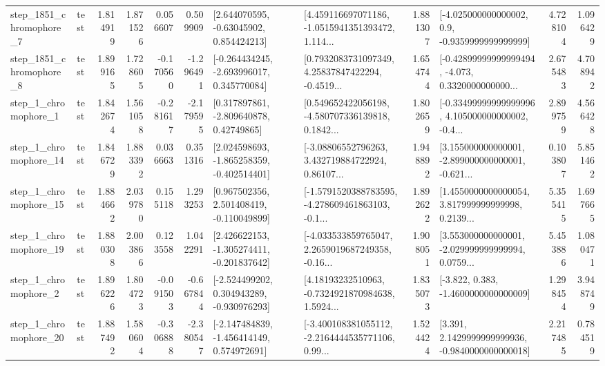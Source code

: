 \begin{tabular}{llrrrrllrlrr}
  step\_1851\_chromophore\_7 &      test &      1.814919 &    1.871526 &      0.056607 &  0.509909 &     [2.644070595, -0.63045902, 0.854424213] &  [4.459116697071186, -1.0515941351393472, 1.114... &       1.881307 &     [-4.025000000000002, 0.9, -0.9359999999999999] &            4.728104 &          1.096429 \\
  step\_1851\_chromophore\_8 &      test &      1.899165 &    1.728605 &     -0.170560 & -1.296491 &   [-0.264434245, -2.693996017, 0.345770084] &  [0.7932083731097349, 4.25837847422294, -0.4519... &       1.654744 &  [-0.42899999999999494, -4.073, 0.3320000000000... &            2.675483 &          4.708942 \\
     step\_1\_chromophore\_1 &      test &      1.842674 &    1.561058 &     -0.281617 & -2.179595 &     [0.317897861, -2.809640878, 0.42749865] &  [0.549652422056198, -4.580707336139818, 0.1842... &       1.802659 &  [-0.33499999999999996, 4.105000000000002, -0.4... &            2.899759 &          4.566428 \\
    step\_1\_chromophore\_14 &      test &      1.846729 &    1.883392 &      0.036663 &  0.351316 &   [2.024598693, -1.865258359, -0.402514401] &  [-3.08806552796263, 3.432719884722924, 0.86107... &       1.948892 &  [3.155000000000001, -2.899000000000001, -0.621... &            0.103807 &          5.851462 \\
    step\_1\_chromophore\_15 &      test &      1.884662 &    2.039780 &      0.155118 &  1.293253 &    [0.967502356, 2.501408419, -0.110049899] &  [-1.5791520388783595, -4.278609461863103, -0.1... &       1.892622 &  [1.4550000000000054, 3.817999999999998, 0.2139... &            5.355415 &          1.697665 \\
    step\_1\_chromophore\_19 &      test &      1.880308 &    2.003866 &      0.123558 &  1.042291 &   [2.426622153, -1.305274411, -0.201837642] &  [-4.033533859765047, 2.2659019687249358, -0.16... &       1.908051 &  [3.553000000000001, -2.029999999999994, 0.0759... &            5.453886 &          1.080471 \\
     step\_1\_chromophore\_2 &      test &      1.896226 &    1.804723 &     -0.091503 & -0.667844 &   [-2.524499202, 0.304943289, -0.930976293] &  [4.18193232510963, -0.7324921870984638, 1.5924... &       1.835073 &               [-3.822, 0.383, -1.4600000000000009] &            1.298454 &          3.948749 \\
    step\_1\_chromophore\_20 &      test &      1.887492 &    1.580604 &     -0.306888 & -2.380547 &   [-2.147484839, -1.456414149, 0.574972691] &  [-3.400108381055112, -2.2164444535771106, 0.99... &       1.524424 &   [3.391, 2.1429999999999936, -0.9840000000000018] &            2.217485 &          0.784519 \\

\end{tabular}
